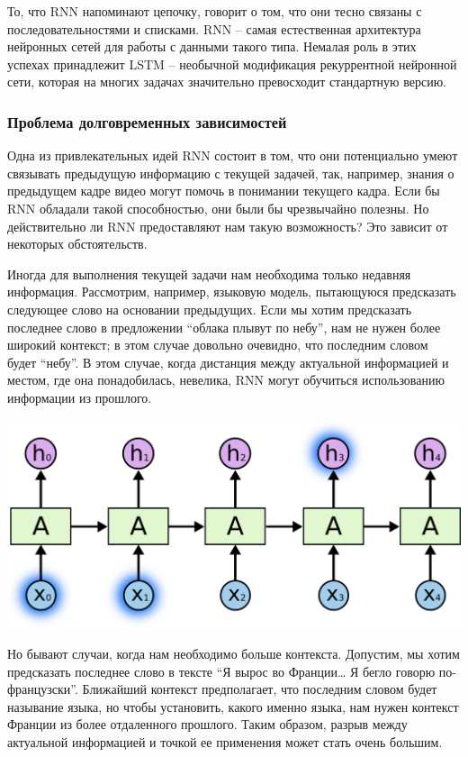 \documentclass[12pt, a4paper, titlepage]{extreport}
\begin{document}
	То, что RNN напоминают цепочку, говорит о том, что они тесно связаны с последовательностями и списками. RNN – самая естественная архитектура нейронных сетей для работы с данными такого типа.
	Немалая роль в этих успехах принадлежит LSTM – необычной модификация рекуррентной нейронной сети, которая на многих задачах значительно превосходит стандартную версию.
	\subsubsection*{Проблема долговременных зависимостей}
	Одна из привлекательных идей RNN состоит в том, что они потенциально умеют связывать предыдущую информацию с текущей задачей, так, например, знания о предыдущем кадре видео могут помочь в понимании текущего кадра. Если бы RNN обладали такой способностью, они были бы чрезвычайно полезны. Но действительно ли RNN предоставляют нам такую возможность? Это зависит от некоторых обстоятельств.
	
	Иногда для выполнения текущей задачи нам необходима только недавняя информация. Рассмотрим, например, языковую модель, пытающуюся предсказать следующее слово на основании предыдущих. Если мы хотим предсказать последнее слово в предложении “облака плывут по небу”, нам не нужен более широкий контекст; в этом случае довольно очевидно, что последним словом будет “небу”. В этом случае, когда дистанция между актуальной информацией и местом, где она понадобилась, невелика, RNN могут обучиться использованию информации из прошлого.
		\begin{center} 
		\includegraphics[scale=0.2]{activation_rnn.png}\\
	\end{center}
	Но бывают случаи, когда нам необходимо больше контекста. Допустим, мы хотим предсказать последнее слово в тексте “Я вырос во Франции… Я бегло говорю по-французски”. Ближайший контекст предполагает, что последним словом будет называние языка, но чтобы установить, какого именно языка, нам нужен контекст Франции из более отдаленного прошлого. Таким образом, разрыв между актуальной информацией и точкой ее применения может стать очень большим.
	
\end{document}
